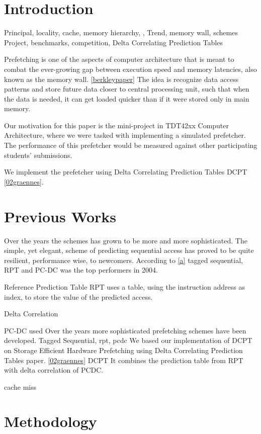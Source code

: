 \documentclass[12pt,journal,compsoc]{IEEEtran}
\begin{document}
\section{Introduction}
Principal, locality, cache, memory hierarchy, , 
Trend, memory wall, schemes
Project, benchmarks, competition, 
Delta Correlating Prediction Tables 

Prefetching is one of the aspects of computer architecture that is meant to
combat the ever-growing gap between execution speed and memory latencies, also
known as the memory wall. \ref{berkleypaper} The idea is recognize data access
patterns and store future data closer to central processing unit, such that when
the data is needed, it can get loaded quicker than if it were stored only in
main memory.

Our motivation for this paper is the mini-project in TDT42xx Computer
Architecture, where we were tasked with implementing a simulated prefetcher.
The performance of this prefetcher would be measured against other participating
students' submissions.

We implement the prefetcher using Delta Correlating Prediction Tables
DCPT \ref{02graennes}. 

\section{Previous Works}
Over the years the schemes has grown to be more and more sophisticated. The
simple, yet elegant, scheme of predicting sequential access has proved to be
quite resilient, performance wise, to newcomers. According to \ref{a} tagged
sequential, RPT and PC-DC was the top performers in 2004.

Reference Prediction Table RPT uses a table, using the instruction address as
index, to store the value of the predicted access.

Delta Correlation

PC-DC used 
Over the years more sophisticated prefetching schemes have been developed.
Tagged Sequential, rpt, pcdc
We based our implementation of DCPT on Storage Efficient Hardware Prefetching
using Delta Correlating Prediction Tables paper. \ref{02graennes}
DCPT It combines the prediction table from RPT with delta
correlation of PCDC.

cache miss

\section{Methodology}
\end{document}
